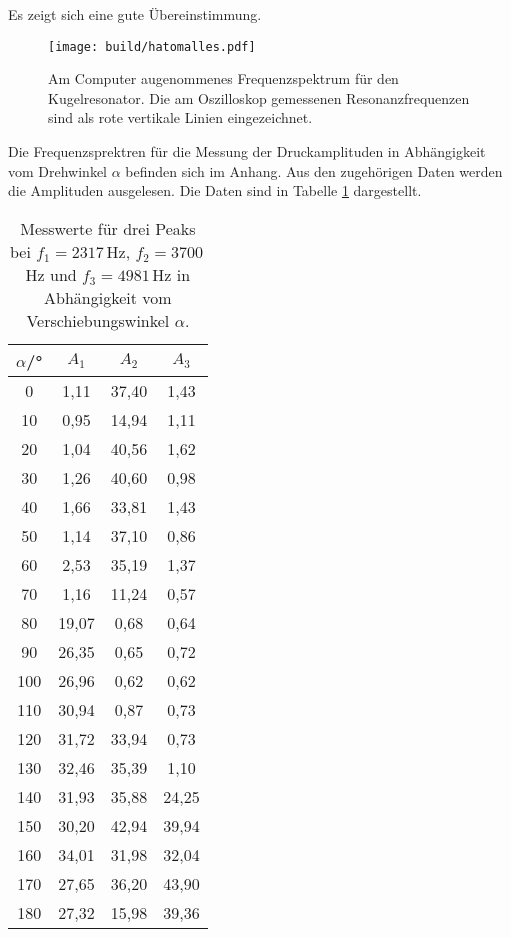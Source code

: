 Es zeigt sich eine gute Übereinstimmung.

\begin{figure}
  \centering
  \texttt{[image: build/hatomalles.pdf]}
  \caption{Am Computer augenommenes Frequenzspektrum für den Kugelresonator.
  Die am Oszilloskop gemessenen Resonanzfrequenzen sind als rote vertikale
  Linien eingezeichnet.}
  \label{fig:hatomalles}
\end{figure}


Die Frequenzsprektren für die Messung der Druckamplituden in Abhängigkeit vom
Drehwinkel $\alpha$ befinden sich im Anhang. Aus den zugehörigen Daten werden
die Amplituden ausgelesen. Die Daten sind in Tabelle \ref{tab:alpha} dargestellt.

\begin{table}[htp]
	\begin{center}
    \caption{Messwerte für drei Peaks bei $f_1=2317$\,Hz, $f_2=3700$\, Hz und
    $f_3=4981$\,Hz in Abhängigkeit vom Verschiebungswinkel $\alpha$.}
    \label{tab:alpha}
		\begin{tabular}{cccc}
		\toprule
			{$\alpha$/°} & {$A_1$} & {$A_2$} & {$A_3$}\\
			\midrule
			0 & 1,11 & 37,40 & 1,43\\
			10 & 0,95 & 14,94 & 1,11\\
			20 & 1,04 & 40,56 & 1,62\\
			30 & 1,26 & 40,60 & 0,98\\
			40 & 1,66 & 33,81 & 1,43\\
			50 & 1,14 & 37,10 & 0,86\\
			60 & 2,53 & 35,19 & 1,37\\
			70 & 1,16 & 11,24 & 0,57\\
			80 & 19,07 & 0,68 & 0,64\\
			90 & 26,35 & 0,65 & 0,72\\
			100 & 26,96 & 0,62 & 0,62\\
			110 & 30,94 & 0,87 & 0,73\\
			120 & 31,72 & 33,94 & 0,73\\
			130 & 32,46 & 35,39 & 1,10\\
			140 & 31,93 & 35,88 & 24,25\\
			150 & 30,20 & 42,94 & 39,94\\
			160 & 34,01 & 31,98 & 32,04\\
			170 & 27,65 & 36,20 & 43,90\\
			180 & 27,32 & 15,98 & 39,36\\
		\bottomrule
		\end{tabular}
	\end{center}
\end{table}

